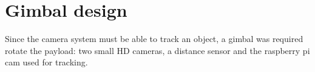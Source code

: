 \chapter{Gimbal design}

Since the camera system must be able to track an object, a gimbal was required rotate the payload: two small HD cameras, a distance sensor and the raspberry pi cam used for tracking.


